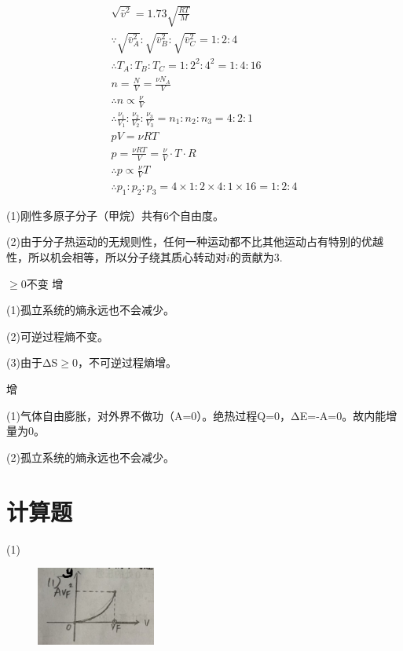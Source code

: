 $$
\begin{array}{*{20}{c}}
 \sqrt { \bar { v } ^ { 2 } } = 1.73 \sqrt { \frac { R T } { M } } \\ \because \sqrt { \bar { v } _ { A } ^ { 2 } } : \sqrt { \bar { v } _ { B } ^ { 2 } }  : \sqrt { \bar { v } _ { C } ^ { 2 } } = 1 : 2 : 4 \\ \therefore T _ { A } : T _ { B } : T _ { C } = 1 : 2 ^ { 2 } : 4 ^ { 2 } = 1 : 4 : 16 \\ n = \frac { N } { V } = \frac { \nu N _ { A } } { V } \\ \therefore n \propto \frac { \nu } { V }\\ \therefore \frac { \nu _ { 1 } } { V _ { 1 } } : \frac { \nu _ { 2 } } { V _ { 2 } } : \frac { \nu _ { 3 } } { V _ { 3 } }  = n _ { 1 } : n _ { 2 } : n _ { 3 } = 4 : 2 : 1 \\ p V  = \nu R T \\ p = \frac { \nu R T } { V }  = \frac { \nu } { V } \cdot T \cdot R \\ \therefore p  \propto \frac { \nu } { V } T \\ \therefore p _ { 1 } : p _ { 2 } : p _ { 3 } = 4 \times 1 : 2 \times 4 : 1 \times 16 = 1 : 2 : 4  
\end{array}
$$


\solve (1)刚性多原子分子（甲烷）共有6个自由度。

(2)由于分子热运动的无规则性，任何一种运动都不比其他运动占有特别的优越性，所以机会相等，所以分子绕其质心转动对$i$的贡献为3.

\exercise $\geqslant 0 $\qquad 不变 \qquad 增

\solve
(1)孤立系统的熵永远也不会减少。

(2)可逆过程熵不变。

(3)由于ΔS$\geqslant 0$，不可逆过程熵增。


 \qquad 增

\solve(1)气体自由膨胀，对外界不做功（A=0）。绝热过程Q=0，ΔE=-A=0。故内能增量为0。

(2)孤立系统的熵永远也不会减少。


\section{计算题}
\exercise

\solve
(1)
\begin{figure}[!ht]
	\centering
	\includegraphics[width=0.35\textwidth]{./pics/Chp12_21.jpg}
\end{figure}

